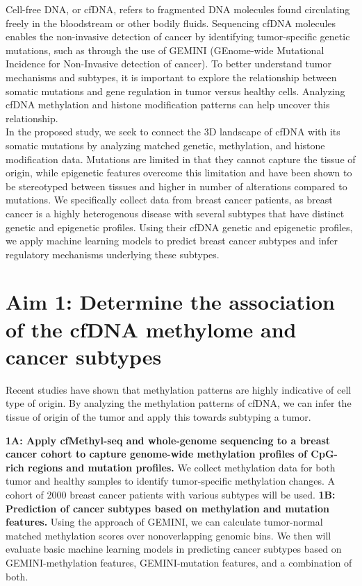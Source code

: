 \documentclass[11pt]{article}
\title{}
\author{}
\date{}
\begin{document}
\vspace{-1cm}

\noindent Cell-free DNA, or cfDNA, refers to fragmented DNA molecules found circulating freely in the bloodstream or other bodily fluids. 
Sequencing cfDNA molecules enables the non-invasive detection of cancer by identifying tumor-specific genetic mutations, such as through the use of GEMINI (GEnome-wide Mutational Incidence for Non-Invasive detection of cancer). \cite{bruhm_single-molecule_2023}
To better understand tumor mechanisms and subtypes, it is important to explore the relationship between somatic mutations and gene regulation in tumor versus healthy cells. Analyzing cfDNA methylation and histone modification patterns can help uncover this relationship. \cite{penny_chromatin-_2024} \\
In the proposed study, we seek to connect the 3D landscape of cfDNA with its somatic mutations by analyzing matched genetic, methylation, and histone modification data. 
Mutations are limited in that they cannot capture the tissue of origin, while epigenetic features overcome this limitation and have been shown to be stereotyped between tissues and higher in number of alterations compared to mutations. \cite{penny_chromatin-_2024} 
We specifically collect data from breast cancer patients, as breast cancer is a 
highly heterogenous disease with several subtypes that have distinct genetic and 
epigenetic profiles. Using their cfDNA genetic and epigenetic profiles, we apply 
machine learning models to predict breast cancer subtypes and infer 
regulatory mechanisms underlying these subtypes.
\section*{Aim 1: Determine the association of the cfDNA methylome and cancer subtypes}
Recent studies have shown that methylation patterns are highly indicative of cell type of origin.\cite{spector_methylome_2023} 
By analyzing the methylation patterns of cfDNA, we can infer the tissue of origin of the tumor and apply this towards subtyping a tumor.

	\textbf{1A: Apply cfMethyl-seq \cite{stackpole_cost-effective_2022} and whole-genome sequencing to a breast cancer cohort to capture genome-wide methylation profiles of CpG-rich regions and mutation profiles.} We collect methylation data for both tumor and healthy samples to identify tumor-specific methylation changes. A cohort of 2000 breast cancer patients with various subtypes will be used.
	\textbf{1B: Prediction of cancer subtypes based on methylation and mutation features.}
		Using the approach of GEMINI, we can calculate tumor-normal matched methylation scores over nonoverlapping genomic bins. We then will evaluate basic machine learning models in predicting cancer subtypes based on GEMINI-methylation features, GEMINI-mutation features, and a combination of both.
\end{document}
